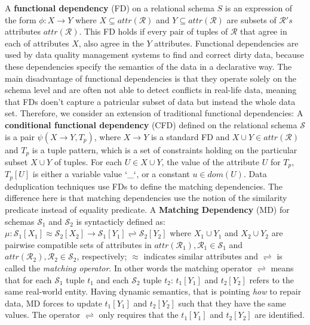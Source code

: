 A \textbf{functional dependency} (FD) on a relational schema $S$ is an expression of the form $\phi: X \rightarrow Y$ where $X \subseteq attr(\mathcal{R}) $ and $Y \subseteq attr(\mathcal{R}) $ are subsets of $\mathcal{R}'s$ attributes $attr(\mathcal{R})$. This FD holds if every pair of tuples of $\mathcal{R}$ that agree in each of attributes $X$, also agree in the $Y$ attributes. Functional dependencies are used by data quality management systems to find and correct dirty data, because these dependencies specify the semantics of the data in a declarative way. The main disadvantage of functional dependencies is that they operate solely on the schema level and are often not able to detect conflicts in real-life data, meaning that FDs doen't capture a patricular subset of data but instead the whole data set.%
Therefore, we consider an  extension of traditional functional dependencies:  A \textbf{conditional functional dependency} (CFD) defined on the relational schema $\mathcal{S}$ is a pair $\psi(X \rightarrow Y , T_p)$,  where $X \rightarrow Y$ is a standard FD and $X \cup Y \in attr(\mathcal{R})$ and $T_p$ is a tuple pattern, which is a set of constraints holding on the particular subset $X \cup Y$ of tuples. For each $U \in X \cup Y$, the value of the attribute $U$ for $T_p$, $T_p[U]$ is either a variable value $`\_`$, or a constant $u \in dom(U)$. Data deduplication techniques use FDs to define the matching dependencies. The difference here is that matching dependencies use the notion of the similarity predicate instead of equality predicate. A \textbf{Matching Dependency} (MD) for schemas $\mathcal{S}_1$ and $\mathcal{S}_2$ is syntacticly defined as:
  $\mu: \mathcal{S}_1[X_1]\approx \mathcal{S}_2[X_2]\rightarrow \mathcal{S}_1[Y_1]\rightleftharpoons \mathcal{S}_2[Y_2]$ 
  where $X_1 \cup Y_1$ and $X_2 \cup Y_2$ are pairwise compatible sets of attributes in $attr(\mathcal{R}_1), \mathcal{R}_1\in \mathcal{S}_1$ and $attr(\mathcal{R}_2), \mathcal{R}_2\in \mathcal{S}_2$, respectively; $\approx$ indicates
  similar attributes and $\rightleftharpoons$ is called the \textit{matching operator}. In other words the matching operator $\rightleftharpoons$ means that for each $\mathcal{S}_1$ tuple $t_1$ and each $\mathcal{S}_2$ tuple $t_2$: $t_1[Y_1]$ and $t_2[Y_2]$ refers to the same real-world entity. Having dynamic semantics, that is pointing \textit{how} to repair data, MD forces to update $t_1[Y_1]$ and $t_2[Y_2]$ such that they have the same values. The operator $\rightleftharpoons$ only requires that the $t_1[Y_1]$ and $t_2[Y_2]$ are identified.

